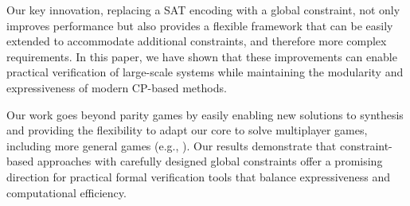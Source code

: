 \documentclass[runningheads]{llncs}
\begin{document}
Our key innovation, replacing a SAT encoding with a global constraint, not only improves performance but also provides a flexible framework that can be easily extended to accommodate additional constraints, and therefore more complex requirements.  In this paper, we have shown that these improvements can enable practical verification of large-scale systems while maintaining the modularity and expressiveness of modern CP-based methods. 

Our work goes beyond parity games by easily enabling new solutions to synthesis and providing the flexibility to adapt our core to solve multiplayer games, including more general games (e.g.,  \wregulargames \cite{ChatterjeeHenzinger:2012}). Our results demonstrate that constraint-based approaches with carefully designed global constraints offer a promising direction for practical formal verification tools that balance expressiveness and computational efficiency.



\end{document}
